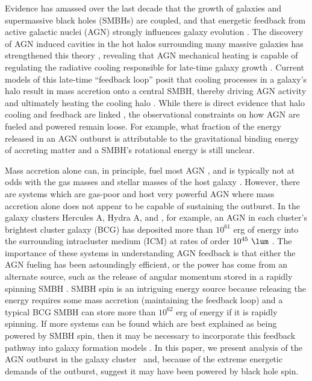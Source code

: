 \documentclass[iop]{emulateapj}
\begin{document}
Evidence has amassed over the last decade that the growth of galaxies
and supermassive black holes (SMBHs) are coupled, and that energetic
feedback from active galactic nuclei (AGN) strongly influences galaxy
evolution \citep[\eg][]{1995ARA&A..33..581K, magorrian,
  1998A&A...331L...1S, 2000MNRAS.311..576K, 2000ApJ...539L...9F,
  2000ApJ...539L..13G, 2002ApJ...574..740T}. The discovery of AGN
induced cavities in the hot halos surrounding many massive galaxies
has strengthened this theory \citep[see][for a review]{mcnamrev},
revealing that AGN mechanical heating is capable of regulating the
radiative cooling responsible for late-time galaxy growth
\citep[\eg][]{birzan04, dunn06, rafferty06}. Current models of this
late-time ``feedback loop'' posit that cooling processes in a galaxy's
halo result in mass accretion onto a central SMBH, thereby driving AGN
activity and ultimately heating the cooling halo
\citep[\eg][]{croton06, bower06, sijacki07}. While there is direct
evidence that halo cooling and feedback are linked
\citep[\eg][]{haradent, rafferty08}, the observational constraints on
how AGN are fueled and powered remain loose. For example, what
fraction of the energy released in an AGN outburst is attributable to
the gravitational binding energy of accreting matter \citep[see][for a
  review]{1984RvMP...56..255B} and a SMBH's rotational energy
\citep[see][for a review]{2002NewAR..46..247M} is still unclear.

Mass accretion alone can, in principle, fuel most AGN
\citep[\eg][]{pizzolato05, 2006MNRAS.372...21A}, and is typically not
at odds with the gas masses and stellar masses of the host galaxy
\citep[\eg][]{rafferty06}. However, there are systems which are
gas-poor and host very powerful AGN where mass accretion alone does
not appear to be capable of sustaining the outburst. In the galaxy
clusters Hercules A, Hydra A, and \ms, for example, an AGN in each
cluster's brightest cluster galaxy (BCG) has deposited more than
$10^{61}$ erg of energy into the surrounding intracluster medium (ICM)
at rates of order $10^{45} ~\lum$ \citep{herca, hydraa, ms0735}. The
importance of these systems in understanding AGN feedback is that
either the AGN fueling has been astoundingly efficient, or the power
has come from an alternate source, such as the release of angular
momentum stored in a rapidly spinning SMBH \citep[\eg][]{msspin,
  minaspin}. SMBH spin is an intriguing energy source because
releasing the energy requires some mass accretion (maintaining the
feedback loop) and a typical BCG SMBH can store more than $10^{62}$
erg of energy if it is rapidly spinning. If more systems can be found
which are best explained as being powered by SMBH spin, then it may be
necessary to incorporate this feedback pathway into galaxy formation
models \citep[\eg][]{2003ApJ...585L.101H, 2007ApJ...658..815S,
  2009MNRAS.397.1302B, gesspin}. In this paper, we present analysis of
the AGN outburst in the galaxy cluster \rbs\ and, because of the
extreme energetic demands of the outburst, suggest it may have been
powered by black hole spin.
\end{document}
